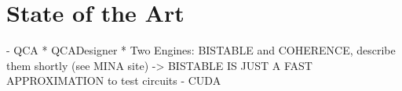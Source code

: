 \chapter{State of the Art}\label{sec:state_of_art}
- QCA 
	* QCADesigner
	* Two Engines: BISTABLE and COHERENCE, describe them shortly (see MINA site)
	-> BISTABLE IS JUST A FAST APPROXIMATION to test circuits
- CUDA